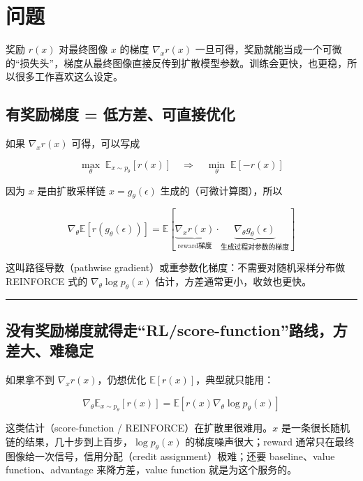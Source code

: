 \section{问题}

奖励 \(r(x)\) 对最终图像 \(x\) 的梯度 \(\nabla_x r(x)\) 一旦可得，奖励就能当成一个可微的“损失头”，梯度从最终图像直接反传到扩散模型参数。训练会更快，也更稳，所以很多工作喜欢这么设定。

\subsection{有奖励梯度 = 低方差、可直接优化}

如果 \(\nabla_x r(x)\) 可得，可以写成

\[
\max_\theta \;\mathbb{E}_{x \sim p_\theta}[r(x)] \quad \Rightarrow \quad \min_\theta \; \mathbb{E}[ -r(x)]
\]

因为 \(x\) 是由扩散采样链 \(x = g_\theta(\epsilon)\) 生成的（可微计算图），所以

\[
\nabla_\theta \mathbb{E} [r(g_\theta(\epsilon))] = \mathbb{E} \left[ \underbrace{\nabla_x r(x)}_{\text{reward梯度}} \cdot \underbrace{\nabla_\theta g_\theta(\epsilon)}_{\text{生成过程对参数的梯度}} \right]
\]

这叫路径导数（pathwise gradient）或重参数化梯度：不需要对随机采样分布做 REINFORCE 式的 \(\nabla_\theta \log p_\theta(x) \) 估计，方差通常更小，收敛也更快。

\hrule

\subsection{没有奖励梯度就得走“RL/score-function”路线，方差大、难稳定}

如果拿不到 \(\nabla_x r(x)\)，仍想优化 \(\mathbb{E}[r(x)]\)，典型就只能用：

\[
\nabla_\theta \mathbb{E}_{x \sim p_\theta}[r(x)] = \mathbb{E}[r(x)\nabla_\theta \log p_\theta(x)]
\]

这类估计（score-function / REINFORCE）在扩散里很难用。\(x\) 是一条很长随机链的结果，几十步到上百步，\(\log p_\theta(x)\) 的梯度噪声很大；reward 通常只在最终图像给一次信号，信用分配（credit assignment）极难；还要 baseline、value function、advantage 来降方差，value function 就是为这个服务的。

